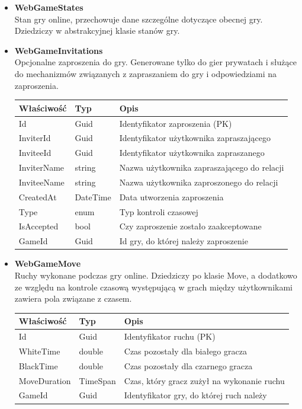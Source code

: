 \documentclass[twoside]{projektInzynierskiMS1}
\begin{document}
\begin{itemize}
    \item \textbf{WebGameStates}\\
    Stan gry online, przechowuje dane szczególne dotyczące obecnej gry. Dziedziczy w abstrakcyjnej klasie stanów gry.
    
    \item \textbf{WebGameInvitations}\\
    Opcjonalne zaproszenia do gry. Generowane tylko do gier prywatach i służące do mechanizmów związanych z zapraszaniem do gry i odpowiedziami na zaproszenia.
    \renewcommand{\arraystretch}{1.2}
    \begin{longtable}{|m{4cm}|m{2cm}|m{8cm}|}
        \hline
        \rowcolor{lightgray}
        \textbf{Właściwość} & \textbf{Typ} & \textbf{Opis} \\ \hline
        \endhead
        \hline
        Id & Guid & Identyfikator zaproszenia (PK) \\ \hline
        InviterId & Guid & Identyfikator użytkownika zapraszającego \\ \hline
        InviteeId & Guid & Identyfikator użytkownika zapraszanego \\ \hline
        InviterName & string & Nazwa użytkownika zapraszającego do relacji \\ \hline
        InviteeName & string & Nazwa użytkownika zaproszonego do relacji \\ \hline
        CreatedAt & DateTime & Data utworzenia zaproszenia \\ \hline
        Type & enum & Typ kontroli czasowej \\ \hline
        IsAccepted & bool & Czy zaproszenie zostało zaakceptowane \\ \hline
        GameId & Guid & Id gry, do której należy zaproszenie \\ \hline
    \end{longtable}

\newpage

    \item \textbf{WebGameMove}\\
    Ruchy wykonane podczas gry online. Dziedziczy po klasie Move, a dodatkowo ze względu na kontrole czasową występującą w grach między użytkownikami zawiera pola związane z czasem.
    \renewcommand{\arraystretch}{1.2}
    \begin{longtable}{|m{4cm}|m{2cm}|m{8cm}|}
        \hline
        \rowcolor{lightgray}
        \textbf{Właściwość} & \textbf{Typ} & \textbf{Opis} \\ \hline
        \endhead
        \hline
        Id & Guid & Identyfikator ruchu (PK) \\ \hline
        WhiteTime & double & Czas pozostały dla białego gracza \\ \hline
        BlackTime & double & Czas pozostały dla czarnego gracza \\ \hline
        MoveDuration & TimeSpan & Czas, który gracz zużył na wykonanie ruchu \\ \hline
        GameId & Guid & Identyfikator gry, do której ruch należy \\ \hline
    \end{longtable}
        

\end{itemize}
\end{document}
